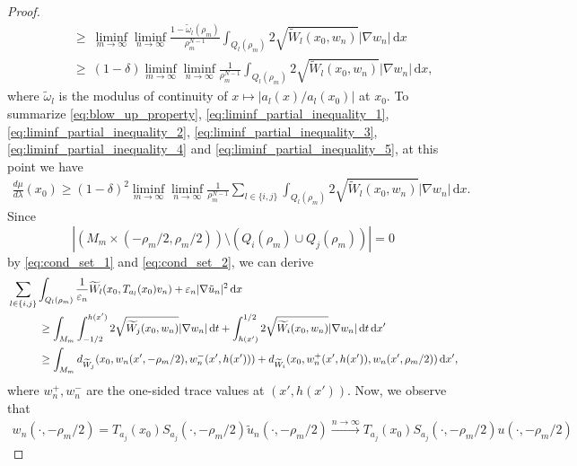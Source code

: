 \documentclass[a4paper, 11pt, reqno]{amsart}
\theoremstyle{plain}
\theoremstyle{definition}
\theoremstyle{remark}
\newcommand{\eps}{\varepsilon}
\begin{document}
\begin{proof}
\begin{align}
        & \hspace{1cm} \geq ~ \liminf_{m \to \infty} \liminf_{n \to \infty} \frac{1-\tilde \omega_l(\rho_m)}{\rho_m^{N-1}}\int_{Q_l(\rho_m)} 2\sqrt{{\widetilde W}_l(x_0, w_n)}|\nabla w_n| \, \mathrm{d}x \nonumber \\
        & \hspace{1cm} \geq ~ (1-\delta) \liminf_{m \to \infty} \liminf_{n \to \infty} \frac{1}{\rho_m^{N-1}} \int_{Q_l(\rho_m)} 2\sqrt{{\widetilde W}_l(x_0, w_n)}|\nabla w_n| \, \mathrm{d}x, 
    \end{align}
    where $\tilde \omega_l$ is the modulus of continuity of $x \mapsto |a_l(x)/a_l(x_0)|$ at $x_0$. To summarize \eqref{eq:blow_up_property}, \eqref{eq:liminf_partial_inequality_1}, \eqref{eq:liminf_partial_inequality_2}, \eqref{eq:liminf_partial_inequality_3}, \eqref{eq:liminf_partial_inequality_4} and \eqref{eq:liminf_partial_inequality_5}, at this point we have 
    \begin{align}\label{eq:liminf_partial_result}
        \frac{d\mu}{d\lambda}(x_0) \geq (1-\delta)^2 \liminf_{m \to \infty} \liminf_{n \to \infty} \frac{1}{\rho_m^{N-1}} \sum_{l \in \{i,j\}} \int_{Q_l(\rho_m)} 2\sqrt{{\widetilde W}_l(x_0, w_n)}|\nabla w_n| \, \mathrm{d}x.
    \end{align}
    Since 
    $$|(M_m \times (-\rho_m/2, \rho_m/2)) \setminus (Q_i(\rho_m) \cup Q_j(\rho_m))| = 0$$ 
    by \eqref{eq:cond_set_1} and \eqref{eq:cond_set_2}, we can derive
    \begin{align}\label{eq:liminf_partial_inequality_6}
        &\sum_{l \in \{i,j\}} \int_{Q_l(\rho_m)} \frac{1}{\eps_n} \widetilde W_l(x_0, T_{a_l}(x_0) v_n) + \eps_n |\nabla \tilde u_n|^2 \, \mathrm{d}x \nonumber \\
        & \hspace{1 cm} \geq \int_{M_m} \int_{-1/2}^{h(x')} 2\sqrt{{\widetilde W}_j(x_0, w_n)}|\nabla w_n| \, \mathrm{d}t + \int_{h(x')}^{1/2} 2\sqrt{{\widetilde W}_i(x_0, w_n)}|\nabla w_n| \, \mathrm{d}t \, \mathrm{d}x' \nonumber \\
        & \hspace{1 cm} \geq \int_{M_m} d_{\widetilde W_j}(x_0, w_n(x', -\rho_m/2), w_n^-(x', h(x'))) + d_{\widetilde W_i}(x_0, w_n^+(x', h(x')), w_n(x', \rho_m/2)) \, \mathrm{d}x',
    \end{align}
    where $w_n^+, w_n^-$ are the one-sided trace values at $(x', h(x'))$.
    Now, we observe that 
    \begin{align*}
        w_n(\cdot , -\rho_m/2) = T_{a_j}(x_0)S_{a_j}(\cdot , -\rho_m/2)\tilde u_n(\cdot, -\rho_m/2) \xrightarrow{n \to \infty} T_{a_j}(x_0)S_{a_j}(\cdot , -\rho_m/2)u(\cdot, -\rho_m/2)

\end{align*}
\end{proof}
\end{document}
